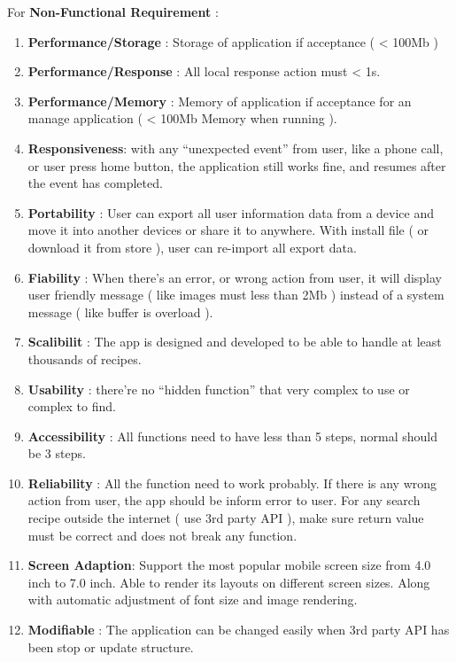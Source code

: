 \documentclass{article}
\begin{document}
    For \textbf{ Non-Functional Requirement} :   \\
    \begin{enumerate}
        \item \textbf{Performance/Storage} : Storage of application if acceptance ( < 100Mb )
        \item \textbf{Performance/Response} : All local response action must < 1s.
        \item \textbf{Performance/Memory} : Memory of application if acceptance for an manage application ( < 100Mb Memory when running ).
        \item \textbf{Responsiveness}: with any “unexpected event” from user, like a phone call, or user press home button, the application still works fine, and resumes after the event has completed. 
        \item \textbf{Portability} : User can export all user information data from a device and move it into another devices or share it to anywhere. With install file ( or download it from store ), user can re-import all export data.
        \item \textbf{Fiability} : When there's an error, or wrong action from user, it will display user friendly message ( like images must less than 2Mb ) instead of a system message ( like buffer is overload ).
        \item \textbf{Scalibilit} : The app is designed and developed to be able to handle at least thousands of recipes. 
        \item \textbf{Usability} : there’re no “hidden function” that very complex to use or complex to find. 
        \item \textbf{Accessibility} : All functions need to have less than 5 steps, normal should be 3 steps. 
        \item \textbf{Reliability} : All the function need to work probably. If there is any wrong action from user, the app should be inform error to user. For any search recipe outside the internet ( use 3rd party API ), make sure return value must be correct and does not break any function. 
        \item \textbf{Screen Adaption}: Support the most popular mobile screen size from 4.0 inch to 7.0 inch. Able to render its layouts on different screen sizes. Along with automatic adjustment of font size and image rendering. 
        \item \textbf{Modifiable} : The application can be changed easily when 3rd party API has been stop or update structure. 

\end{enumerate}
\end{document}
